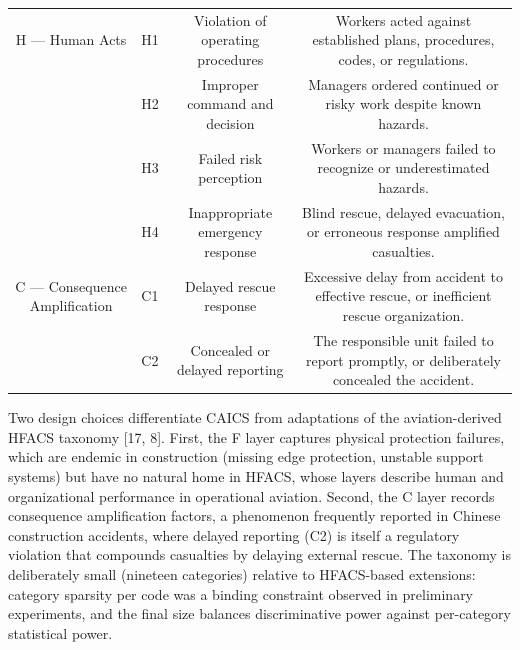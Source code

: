 \documentclass[11pt]{article}
\begin{document}
\begin{table}[htbp]
\begin{tabular}{cccc}
H --- Human Acts & H1 & Violation of operating procedures & Workers acted against established plans, procedures, codes, or regulations. \\
 & H2 & Improper command and decision & Managers ordered continued or risky work despite known hazards. \\
 & H3 & Failed risk perception & Workers or managers failed to recognize or underestimated hazards. \\
 & H4 & Inappropriate emergency response & Blind rescue, delayed evacuation, or erroneous response amplified casualties. \\
C --- Consequence Amplification & C1 & Delayed rescue response & Excessive delay from accident to effective rescue, or inefficient rescue organization. \\
 & C2 & Concealed or delayed reporting & The responsible unit failed to report promptly, or deliberately concealed the accident. \\
\hline
\end{tabular}
\end{table}
Two design choices differentiate CAICS from adaptations of the aviation-derived HFACS taxonomy [17, 8]. First, the F layer captures physical protection failures, which are endemic in construction (missing edge protection, unstable support systems) but have no natural home in HFACS, whose layers describe human and organizational performance in operational aviation. Second, the C layer records consequence amplification factors, a phenomenon frequently reported in Chinese construction accidents, where delayed reporting (C2) is itself a regulatory violation that compounds casualties by delaying external rescue. The taxonomy is deliberately small (nineteen categories) relative to HFACS-based extensions: category sparsity per code was a binding constraint observed in preliminary experiments, and the final size balances discriminative power against per-category statistical power.
\end{document}
